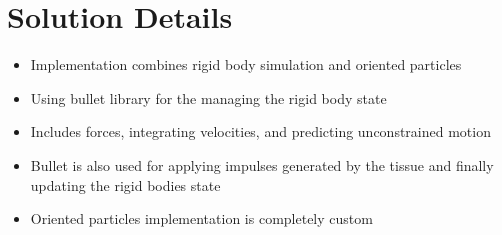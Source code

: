\chapter{Solution Details}
\label{cha:solution_details}

\begin{itemize}
\item Implementation combines rigid body simulation and oriented particles
\item Using bullet library for the managing the rigid body state
\item Includes forces, integrating velocities, and predicting unconstrained motion
\item Bullet is also used for applying impulses generated by the tissue and finally updating the rigid bodies state
\item Oriented particles implementation is completely custom
\end{itemize}

